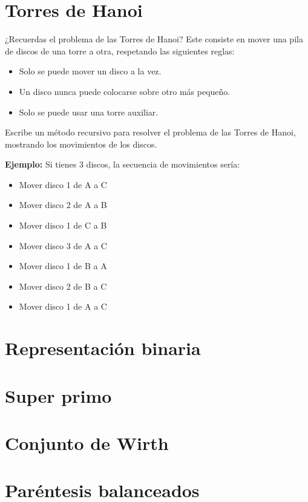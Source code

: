 \section{Torres de Hanoi}
¿Recuerdas el problema de las Torres de Hanoi? Este consiste en mover una pila de discos de una torre a otra, respetando las siguientes reglas:
\begin{itemize}
    \item Solo se puede mover un disco a la vez.
    \item Un disco nunca puede colocarse sobre otro más pequeño.
    \item Solo se puede usar una torre auxiliar.
\end{itemize}

Escribe un método recursivo para resolver el problema de las Torres de Hanoi, mostrando los movimientos de los discos.

\textbf{Ejemplo:}
Si tienes 3 discos, la secuencia de movimientos sería:
\begin{itemize}
    \item Mover disco 1 de A a C
    \item Mover disco 2 de A a B
    \item Mover disco 1 de C a B
    \item Mover disco 3 de A a C
    \item Mover disco 1 de B a A
    \item Mover disco 2 de B a C
    \item Mover disco 1 de A a C
\end{itemize}

\section{Representación binaria}


\section{Super primo}


\section{Conjunto de Wirth}


\section{Paréntesis balanceados}


